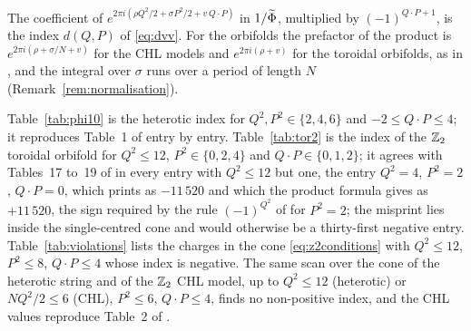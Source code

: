  The coefficient of $e^{2\pi i(\rho Q^2/2 + \sigma P^2/2 + v\,Q\cdot P)}$ in $1/\widetilde{\Phi}$, multiplied by $(-1)^{Q\cdot P+1}$, is the index $d(Q,P)$ of \eqref{eq:dvv}. For the orbifolds the prefactor of the product is $e^{2\pi i(\rho + \sigma/N + v)}$ for the CHL models and $e^{2\pi i(\rho + v)}$ for the toroidal orbifolds, as in \cite{CD19}, and the integral over $\sigma$ runs over a period of length $N$ (Remark~\ref{rem:normalisation}).

 Table~\ref{tab:phi10} is the heterotic index for $Q^2,P^2\in\{2,4,6\}$ and $-2\le Q\cdot P\le 4$; it reproduces Table~1 of \cite{Sen11positivity} entry by entry. Table~\ref{tab:tor2} is the index of the $\mathbb{Z}_2$ toroidal orbifold for $Q^2\le 12$, $P^2\in\{0,2,4\}$ and $Q\cdot P\in\{0,1,2\}$; it agrees with Tables~17 to~19 of \cite{CD19} in every entry with $Q^2\le 12$ but one, the entry $Q^2=4$, $P^2=2$, $Q\cdot P=0$, which \cite{CD19} prints as $-11\,520$ and which the product formula gives as $+11\,520$, the sign required by the rule $(-1)^{Q^2}$ of \cite{CD19} for $P^2=2$; the misprint lies inside the single-centred cone and would otherwise be a thirty-first negative entry. Table~\ref{tab:violations} lists the charges in the cone \eqref{eq:z2conditions} with $Q^2\le 12$, $P^2\le 8$, $Q\cdot P\le 4$ whose index is negative. The same scan over the cone of the heterotic string and of the $\mathbb{Z}_2$ CHL model, up to $Q^2\le 12$ (heterotic) or $NQ^2/2\le 6$ (CHL), $P^2\le 6$, $Q\cdot P\le 4$, finds no non-positive index, and the CHL values reproduce Table~2 of \cite{Sen11positivity}.



